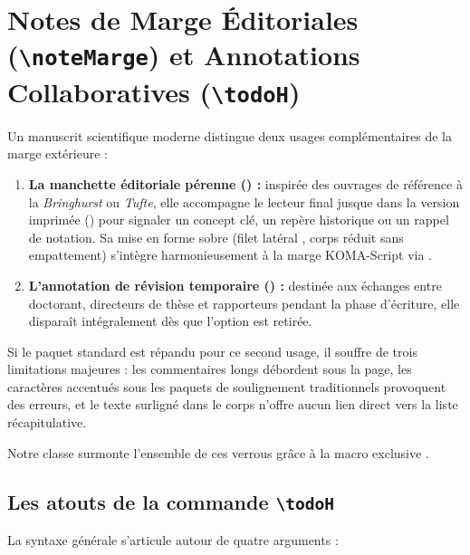 \section{Notes de Marge Éditoriales (\texttt{\textbackslash noteMarge}) et Annotations Collaboratives (\texttt{\textbackslash todoH})}
\label{sec:collaboration-todoh}

Un manuscrit scientifique moderne distingue deux usages complémentaires de la marge extérieure :
\begin{enumerate}
  \item \textbf{La manchette éditoriale pérenne () :}
  inspirée des ouvrages de référence à la \textit{Bringhurst} ou \textit{Tufte}, elle accompagne le lecteur final jusque dans la version imprimée () pour signaler un concept clé, un repère historique ou un rappel de notation.
  Sa mise en forme sobre (filet latéral , corps réduit sans empattement) s'intègre harmonieusement à la marge KOMA-Script via .
  \item \textbf{L'annotation de révision temporaire () :}
  destinée aux échanges entre doctorant, directeurs de thèse et rapporteurs pendant la phase d'écriture, elle disparaît intégralement dès que l'option  est retirée.
\end{enumerate}

Si le paquet standard  est répandu pour ce second usage, il souffre de trois limitations majeures :
les commentaires longs débordent sous la page,
les caractères accentués sous les paquets de soulignement traditionnels provoquent des erreurs,
et le texte surligné dans le corps n'offre aucun lien direct vers la liste récapitulative.

Notre classe surmonte l'ensemble de ces verrous grâce à la macro exclusive .

\subsection{Les atouts de la commande \texttt{\textbackslash todoH}}
La syntaxe générale s'articule autour de quatre arguments :
\begin{center}
\end{center}


